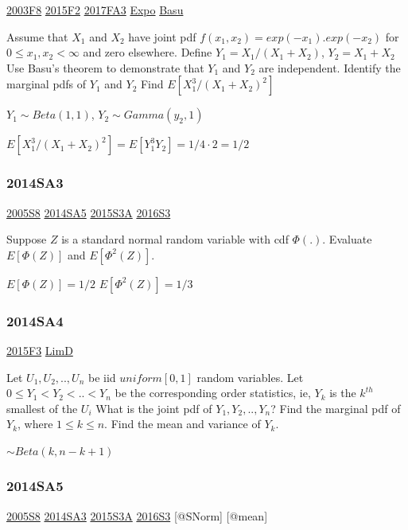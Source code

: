 \documentclass[10pt,twocolumn,portrait]{article}
\begin{document}
\protect\hyperlink{f8-1}{2003F8} \protect\hyperlink{f2-5}{2015F2}
\protect\hyperlink{fa3-3}{2017FA3} \protect\hyperlink{Expo}{Expo}
\protect\hyperlink{Basu}{Basu}

Assume that \(X_1\) and \(X_2\) have joint pdf
\(f(x_1,x_2)=exp(-x_1 ).exp(-x_2)\) for \(0\le x_1,x_2<\infty\) and zero
elsewhere. Define \(Y_1=X_1/(X_1+X_2)\), \(Y_2=X_1+X_2\) Use Basu's
theorem to demonstrate that \(Y_1\) and \(Y_2\) are independent.
Identify the marginal pdfs of \(Y_1\) and \(Y_2\) Find
\(E[X_1^3/(X_1+X_2)^2]\)

\(Y_1\sim Beta(1,1)\), \(Y_2\sim Gamma(y_2,1)\)

\(E[X_1^3/(X_1+X_2)^2]=E[Y_1^3Y_2]=1/4\cdot2=1/2\)

\hypertarget{sa3-2}{%
\subsubsection{2014SA3}\label{sa3-2}}

\protect\hyperlink{s8-1}{2005S8} \protect\hyperlink{sa5-1}{2014SA5}
\protect\hyperlink{s3a-1}{2015S3A} \protect\hyperlink{s3-4}{2016S3}

Suppose \(Z\) is a standard normal random variable with cdf \(\Phi(.)\).
Evaluate \(E[\Phi(Z)]\) and \(E[\Phi^{2}(Z)]\).

\(E[\Phi(Z)]=1/2\) \(E[\Phi^{2}(Z)]=1/3\)

\hypertarget{sa4-2}{%
\subsubsection{2014SA4}\label{sa4-2}}

\protect\hyperlink{f3-5}{2015F3} \protect\hyperlink{LimD}{LimD}

Let \(U_1,U_2,..,U_n\) be iid \(uniform[0,1]\) random variables. Let
\(0\le Y_1<Y_2<..<Y_n\) be the corresponding order statistics, ie,
\(Y_k\) is the \(k^{th}\) smallest of the \(U_i\) What is the joint pdf
of \(Y_1,Y_2,..,Y_n\)? Find the marginal pdf of \(Y_k\), where
\(1\le k\le n\). Find the mean and variance of \(Y_k\).

\(\sim Beta(k,n-k+1)\)

\hypertarget{sa5-1}{%
\subsubsection{2014SA5}\label{sa5-1}}

\protect\hyperlink{s8-1}{2005S8} \protect\hyperlink{sa3-2}{2014SA3}
\protect\hyperlink{s3a-1}{2015S3A} \protect\hyperlink{s3-4}{2016S3}
{[}@SNorm{]} {[}@mean{]}
\end{document}
